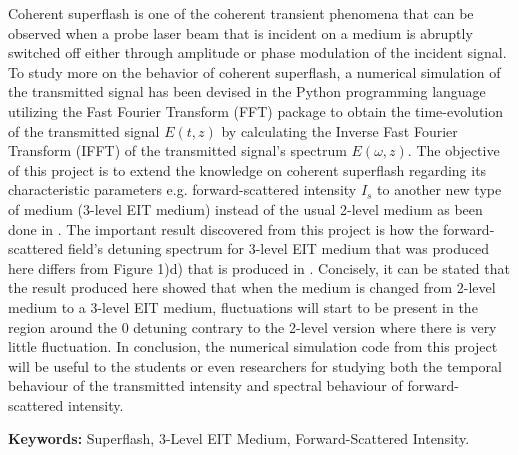 
Coherent superflash is one of the coherent transient phenomena that can be observed when a probe laser beam that is incident on a medium is abruptly switched off either through amplitude or phase modulation of the incident signal. To study more on the behavior of coherent superflash, a numerical simulation of the transmitted signal has been devised in the Python programming language utilizing the Fast Fourier Transform (FFT) package to obtain the time-evolution of the transmitted signal $E(t, z)$ by calculating the Inverse Fast Fourier Transform (IFFT) of the transmitted signal's spectrum $E(\omega, z)$. The objective of this project is to extend the knowledge on coherent superflash regarding its characteristic parameters e.g. forward-scattered intensity $I_{s}$ to another new type of medium (3-level EIT medium) instead of the usual 2-level medium as been done in \cite{Kwong2014}. The important result discovered from this project is how the forward-scattered field's detuning spectrum for 3-level EIT medium that was produced here differs from Figure 1)d) that is produced in \cite{Kwong2014}. Concisely, it can be stated that the result produced here showed that when the medium is changed from 2-level medium to a 3-level EIT medium, fluctuations will start to be present in the region around the 0 detuning contrary to the 2-level version where there is very little fluctuation. In conclusion, the numerical simulation code from this project will be useful to the students or even researchers for studying both the temporal behaviour of the transmitted intensity and spectral behaviour of forward-scattered intensity.

\textbf{Keywords: } Superflash, 3-Level EIT Medium, Forward-Scattered Intensity.
